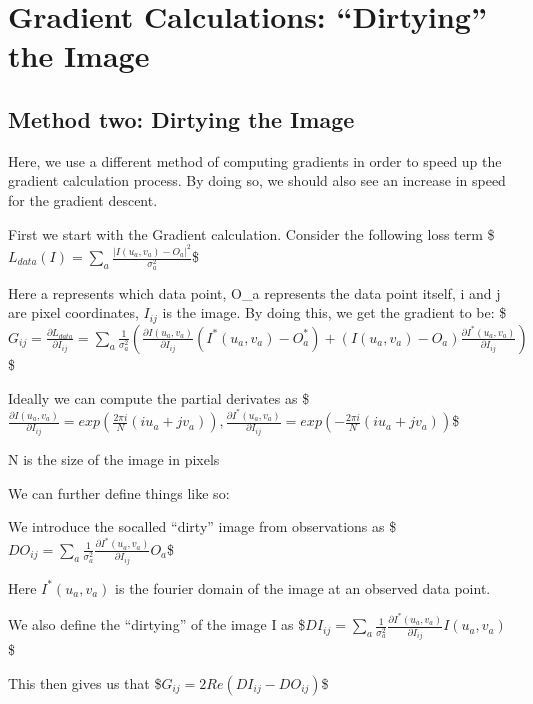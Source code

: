 \documentclass[letterpaper,10pt,english]{jupyterBook}
\begin{document}
\chapter{Gradient Calculations: “Dirtying” the Image}
\label{\detokenize{dirty_gradient:gradient-calculations-dirtying-the-image}}\label{\detokenize{dirty_gradient::doc}}

\section{Method two: Dirtying the Image}
\label{\detokenize{dirty_gradient:method-two-dirtying-the-image}}
\sphinxAtStartPar
Here, we use a different method of computing gradients in order to speed up the gradient calculation process. By doing so, we should also see an increase in speed for the gradient descent.

\sphinxAtStartPar
First we start with the Gradient calculation. Consider the following loss term \$\(L_{data}(I) = \sum_a\frac{|I(u_a,v_a)-O_a|^2}{\sigma_a^2}\)\$

\sphinxAtStartPar
Here a represents which data point, O\_a represents the data point itself, i and j are pixel coordinates, \(I_{ij}\) is the image. By doing this, we get the gradient to be: \$\(G_{ij} = \frac{\partial L_{data}}{\partial I_{ij}} = \sum_a \frac{1}{\sigma_a^2}(\frac{\partial I(u_a,v_a)}{\partial I_{ij}}(I^*(u_a,v_a)-O_a^*) + (I(u_a,v_a)-O_a)\frac{\partial I^*(u_a,v_a)}{\partial I_{ij}})\)\$

\sphinxAtStartPar
Ideally we can compute the partial derivates as \$\(\frac{\partial I(u_a,v_a)}{\partial I_{ij}} = exp(\frac{2\pi i}{N}(iu_a+jv_a)), \frac{\partial I^*(u_a,v_a)}{\partial I_{ij}} = exp(-\frac{2\pi i}{N}(iu_a+jv_a))\)\$

\sphinxAtStartPar
N is the size of the image in pixels

\sphinxAtStartPar
We can further define things like so:

\sphinxAtStartPar
We introduce the so\sphinxhyphen{}called “dirty” image from observations as \$\(DO_{ij} = \sum_a \frac{1}{\sigma^2_a}\frac{\partial I^*(u_a,v_a)}{\partial I_{ij}}O_a\)\$

\sphinxAtStartPar
Here \(I^*(u_a,v_a)\) is the fourier domain of the image at an observed data point.

\sphinxAtStartPar
We also define the “dirtying” of the image I as \$\(DI_{ij} = \sum_a \frac{1}{\sigma^2_a}\frac{\partial I^*(u_a,v_a)}{\partial I_{ij}}I(u_a,v_a)\)\$

\sphinxAtStartPar
This then gives us that \$\(G_{ij} = 2Re(DI_{ij}-DO_{ij})\)\$
\end{document}
